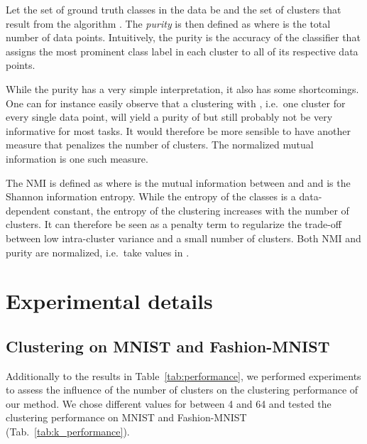 \documentclass{article}
\begin{document}
Let the set of ground truth classes in the data be  and the set of clusters that result from the algorithm .
The \emph{purity}  is then defined as  where  is the total number of data points.
Intuitively, the purity is the accuracy of the classifier that assigns the most prominent class label in each cluster to all of its respective data points.

While the purity has a very simple interpretation, it also has some shortcomings.
One can for instance easily observe that a clustering with , i.e.\ one cluster for every single data point, will yield a purity of  but still probably not be very informative for most tasks.
It would therefore be more sensible to have another measure that penalizes the number of clusters.
The normalized mutual information is one such measure.

The NMI is defined as  where  is the mutual information between  and  and  is the Shannon information entropy.
While the entropy of the classes is a data-dependent constant, the entropy of the clustering increases with the number of clusters.
It can therefore be seen as a penalty term to regularize the trade-off between low intra-cluster variance and a small number of clusters.
Both NMI and purity are normalized, i.e.\ take values in .



\section{Experimental details}


\subsection{Clustering on MNIST and Fashion-MNIST} \label{sec:mnist_appendix}

Additionally to the results in Table~\ref{tab:performance}, we performed experiments to assess the influence of the number of clusters  on the clustering performance of our method.
We chose different values for  between 4 and 64 and tested the clustering performance on MNIST and Fashion-MNIST (Tab.~\ref{tab:k_performance}).
\end{document}
